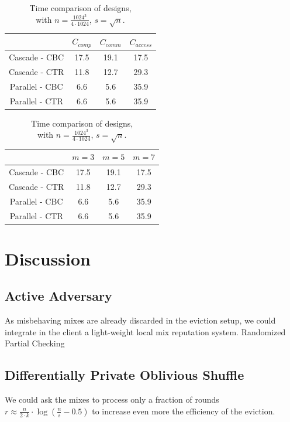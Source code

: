 \documentclass[USenglish,oneside,twocolumn]{article}
\begin{document}
\begin{table}
\begin{minipage}[t][][b]{.475\textwidth}
\vspace{0pt}
\centering
\begin{tabular}{*4c}
\toprule
    				& $C_{comp}$  	 & $C_{comm}$		& $C_{access}$\\
\midrule
Cascade - CBC   &  17.5 		& 19.1   		& 17.5  \\
Cascade - CTR   &  11.8 		& 12.7   		& 29.3  \\
Parallel - CBC  &  6.6  		&  5.6   		& 35.9  \\
Parallel - CTR  &  6.6  		&  5.6   		& 35.9  \\
\bottomrule
\end{tabular}
\centering
\caption{Cost comparison of designs.}
\end{minipage}
\hfill
\begin{minipage}[t][][b]{.475\textwidth}
\vspace{0pt}
\begin{tabular}{*4c}
\toprule
    				& $m=3$  	 & $m=5$		& $m=7$\\
\midrule
Cascade - CBC   &  17.5 		& 19.1   		& 17.5  \\
Cascade - CTR   &  11.8 		& 12.7   		& 29.3  \\
Parallel - CBC  &  6.6  		&  5.6   		& 35.9  \\
Parallel - CTR  &  6.6  		&  5.6   		& 35.9  \\
\bottomrule
\end{tabular}
\centering
\caption{Time comparison of designs,\\with $n=\frac{1024^3}{4\cdot 1024}$, $s=\sqrt n$.}
\end{minipage}
\end{table}


\section{Discussion}\label{Discussion}

\subsection{Active Adversary}\label{Active Adversary}
As misbehaving mixes are already discarded in the eviction setup, we could integrate in the client a light-weight local mix reputation system.
Randomized Partial Checking


\subsection{Differentially Private Oblivious Shuffle}\label{DPOS}
We could ask the mixes to process only a fraction of rounds $r \approx \frac{n}{2\cdot k }  \cdot \log \left (\frac{n}{s}-0.5 \right)$ to increase even more the efficiency of the eviction.
\end{document}

